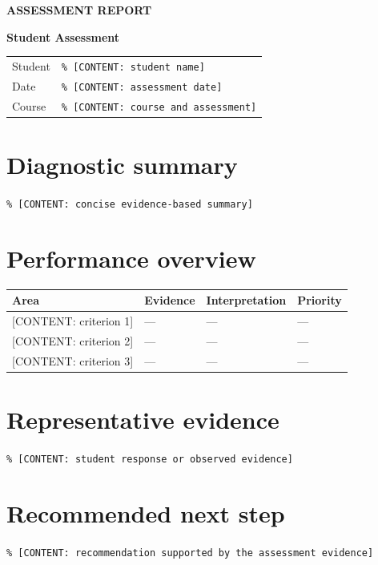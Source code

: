 \documentclass[11pt,a4paper]{scrartcl}
\begin{document}
{\small\sffamily\bfseries\color{Muted}ASSESSMENT REPORT\par}
{\Huge\bfseries Student Assessment\par}

\vspace{1.5\baselineskip}

\begin{tabularx}{\linewidth}{@{}lX@{}}
Student & \texttt{\% [CONTENT: student name]} \\
Date & \texttt{\% [CONTENT: assessment date]} \\
Course & \texttt{\% [CONTENT: course and assessment]} \\
\end{tabularx}

\section{Diagnostic summary}
\texttt{\% [CONTENT: concise evidence-based summary]}

\section{Performance overview}
\begin{tabularx}{\linewidth}{@{}Xlll@{}}
\toprule
Area & Evidence & Interpretation & Priority \\
\midrule
{}[CONTENT: criterion 1] & --- & --- & --- \\
{}[CONTENT: criterion 2] & --- & --- & --- \\
{}[CONTENT: criterion 3] & --- & --- & --- \\
\bottomrule
\end{tabularx}

\section{Representative evidence}
\texttt{\% [CONTENT: student response or observed evidence]}

\section{Recommended next step}
\texttt{\% [CONTENT: recommendation supported by the assessment evidence]}
\end{document}
